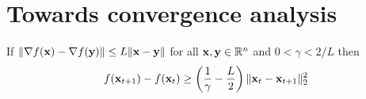 \section{Towards convergence analysis}\label{sec:convergence}




\begin{lemma}\label{lem:pgd-step}
	If $\|\nabla f(\mathbf x) - \nabla f(\mathbf y)\| \le L \|\mathbf x - \mathbf y\|$ for all $\mathbf x, \mathbf y \in \mathbb R^n$ and $0 < \gamma < 2/L$ then 
	\begin{align*}
	f(\mathbf x_{t + 1}) - f(\mathbf x_t) \ge \left(\frac{1}{\gamma} - \frac{L}{2}\right)\|\mathbf x_t - \mathbf x_{t+1}\|_2^2
	\end{align*}
	
\end{lemma}

